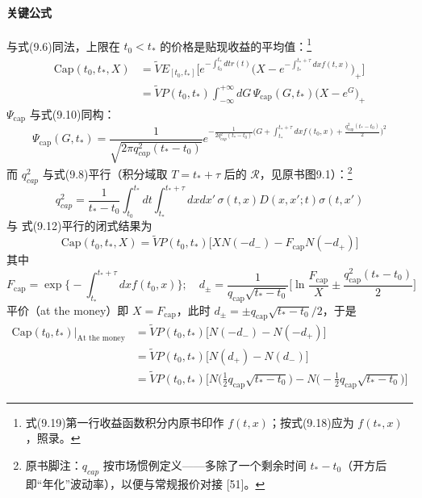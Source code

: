 \paragraph{关键公式}
与式(9.6)同法，上限在 $t_0<t_*$ 的价格是贴现收益的平均值：\footnote{式(9.19)第一行收益函数积分内原书印作 $f(t,x)$；按式(9.18)应为
$f(t_*,x)$，照录。}
\begin{align*}
\mathrm{Cap}(t_0,t_*,X)
&=\tilde{V}E_{[t_0,t_*]}\biggl[e^{-\int_{t_0}^{t_*}dtr(t)}
\biggl(X-e^{-\int_{t_*}^{t_*+\tau}dxf(t,x)}\biggr)_{+}\biggr]\\
&=\tilde{V}P(t_0,t_*)\int_{-\infty}^{+\infty}dG\,
\Psi_{\mathrm{cap}}(G,t_*)\bigl(X-e^{G}\bigr)_{+}
\tag{9.19}\end{align*}$\Psi_{\mathrm{cap}}$ 与式(9.10)同构：
\begin{equation*}
\Psi_{\mathrm{cap}}(G,t_*)=\frac{1}{\sqrt{2\pi q^{2}_{cap}(t_*-t_0)}}
e^{-\frac{1}{2q^{2}_{cap}(t_*-t_0)}\bigl(G+\int_{t_*}^{t_*+\tau}
dxf(t_0,x)+\frac{q^{2}_{cap}(t_*-t_0)}{2}\bigr)^{2}}
\end{equation*}
而 $q^{2}_{cap}$ 与式(9.8)平行（积分域取 $T=t_*+\tau$ 后的
$\mathcal{R}$，见原书图9.1）：\footnote{原书脚注：$q_{cap}$ 按市场惯例定义——多除了一个剩余时间
$t_*-t_0$（开方后即“年化”波动率），以便与常规报价对接 [51]。}
\begin{equation*}
q^{2}_{cap}=\frac{1}{t_*-t_0}\int_{t_0}^{t_*}dt
\int_{t_*}^{t_*+\tau}dxdx'\,\sigma(t,x)D(x,x';t)\sigma(t,x')\tag{9.20}
\end{equation*}与
式(9.12)平行的闭式结果为
\begin{equation*}
\mathrm{Cap}(t_0,t_*,X)=\tilde{V}P(t_0,t_*)\bigl[XN(-d_{-})
-F_{\mathrm{cap}}N(-d_{+})\bigr]\tag{9.21}
\end{equation*}
其中
\begin{equation*}
F_{\mathrm{cap}}=\exp\biggl\{-\int_{t_*}^{t_*+\tau}dxf(t_0,x)\biggr\};\quad
d_{\pm}=\frac{1}{q_{\mathrm{cap}}\sqrt{t_*-t_0}}
\biggl[\ln\frac{F_{\mathrm{cap}}}{X}\pm
\frac{q^{2}_{\mathrm{cap}}(t_*-t_0)}{2}\biggr]
\end{equation*}
平价（at the money）即 $X=F_{\mathrm{cap}}$，此时
$d_{\pm}=\pm q_{\mathrm{cap}}\sqrt{t_*-t_0}/2$，于是
\begin{align*}
\mathrm{Cap}(t_0,t_*)\big|_{\text{At the money}}
&=\tilde{V}P(t_0,t_*)\bigl[N(-d_{-})-N(-d_{+})\bigr]\\
&=\tilde{V}P(t_0,t_*)\bigl[N(d_{+})-N(d_{-})\bigr]\\
&=\tilde{V}P(t_0,t_*)\biggl[N\biggl(\frac{1}{2}q_{\mathrm{cap}}
\sqrt{t_*-t_0}\biggr)-N\biggl(-\frac{1}{2}q_{\mathrm{cap}}
\sqrt{t_*-t_0}\biggr)\biggr]\tag{9.22}
\end{align*}

